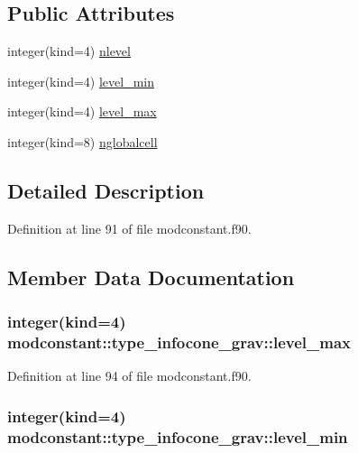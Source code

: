 \subsection*{Public Attributes}
\begin{DoxyCompactItemize}
\item 
integer(kind=4) \hyperlink{structmodconstant_1_1type__infocone__grav_a711b971de6fe902d47b0c0d562f27669}{nlevel}
\item 
integer(kind=4) \hyperlink{structmodconstant_1_1type__infocone__grav_a36518b61b1bc514207eba68f31b61aac}{level\-\_\-min}
\item 
integer(kind=4) \hyperlink{structmodconstant_1_1type__infocone__grav_a812083e033cd92682efbd00c2baaf5e9}{level\-\_\-max}
\item 
integer(kind=8) \hyperlink{structmodconstant_1_1type__infocone__grav_abad2550433b2e48e7e4b82ad05021b80}{nglobalcell}
\end{DoxyCompactItemize}


\subsection{Detailed Description}


Definition at line 91 of file modconstant.\-f90.



\subsection{Member Data Documentation}
\hypertarget{structmodconstant_1_1type__infocone__grav_a812083e033cd92682efbd00c2baaf5e9}{
\subsubsection[{level\-\_\-max}]{\setlength{\rightskip}{0pt plus 5cm}integer(kind=4) modconstant\-::type\-\_\-infocone\-\_\-grav\-::level\-\_\-max}}\label{structmodconstant_1_1type__infocone__grav_a812083e033cd92682efbd00c2baaf5e9}


Definition at line 94 of file modconstant.\-f90.

\hypertarget{structmodconstant_1_1type__infocone__grav_a36518b61b1bc514207eba68f31b61aac}{
\subsubsection[{level\-\_\-min}]{\setlength{\rightskip}{0pt plus 5cm}integer(kind=4) modconstant\-::type\-\_\-infocone\-\_\-grav\-::level\-\_\-min}}\label{structmodconstant_1_1type__infocone__grav_a36518b61b1bc514207eba68f31b61aac}


